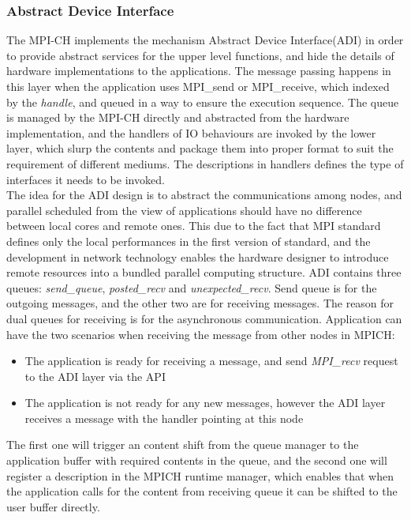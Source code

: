 \documentclass[11pt,openright,a4paper]{report}
\begin{document}
\subsubsection{Abstract Device Interface}
The MPI-CH implements the mechanism Abstract Device Interface(ADI) in order to provide abstract services for the upper level functions, and hide the details of hardware implementations to the applications\cite{gropp1994abstract}. The message passing happens in this layer when the application uses MPI\_send or MPI\_receive, which indexed by the \textit{handle}, and queued in a way to ensure the execution sequence. The queue is managed by the MPI-CH directly and abstracted from the hardware implementation, and the handlers of IO behaviours are invoked by the lower layer, which slurp the contents and package them into proper format to suit the requirement of different mediums. The descriptions in handlers defines the type of interfaces it needs to be invoked.\\
The idea for the ADI design is to abstract the communications among nodes, and parallel scheduled from the view of applications should have no difference between local cores and remote ones. This due to the fact that MPI standard defines only the local performances in the first version of standard, and the development in network technology enables the hardware designer to introduce remote resources into a bundled parallel computing structure\cite{liu2004high}. 
ADI contains three queues: \textit{send\_queue}, \textit{posted\_recv} and \textit{unexpected\_recv}.
Send queue is for the outgoing messages, and the other two are for receiving messages. The reason for dual queues for receiving is for the asynchronous communication. Application can have the two scenarios when receiving the message from other nodes in MPICH:
\begin{itemize}
	\item The application is ready for receiving a message, and send \textit{MPI\_recv} request to the ADI layer via the API
	\item The application is not ready for any new messages, however the ADI layer receives a message with the handler pointing at this node
\end{itemize}
The first one will trigger an content shift from the queue manager to the application buffer with required contents in the queue, and the second one will register a description in the MPICH runtime manager, which enables that when the application calls for the content from receiving queue it can be shifted to the user buffer directly. \\
\end{document}
